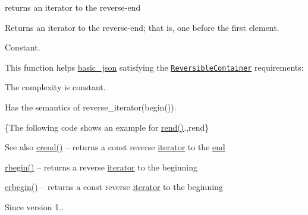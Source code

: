 returns an iterator to the reverse-\/end 

Returns an iterator to the reverse-\/end; that is, one before the first element.

  Constant.

This function helps {\ttfamily \hyperlink{classnlohmann_1_1basic__json}{basic\+\_\+json}} satisfying the \href{http://en.cppreference.com/w/cpp/concept/ReversibleContainer}{\tt Reversible\+Container} requirements\+:
\begin{DoxyItemize}
\item The complexity is constant.
\item Has the semantics of {\ttfamily reverse\+\_\+iterator(begin())}.
\end{DoxyItemize}

\{The following code shows an example for {\ttfamily \hyperlink{classnlohmann_1_1basic__json_aaa160a960dd3dd90856a72b1d8dbe707}{rend()}}.,rend\}

\begin{DoxySeeAlso}{See also}
\hyperlink{classnlohmann_1_1basic__json_aa7084e62b93ef0236698b246a58bb2da}{crend()} -- returns a const reverse \hyperlink{classnlohmann_1_1basic__json_1_1iterator}{iterator} to the \hyperlink{classnlohmann_1_1basic__json_a12ccf14d39ddae52f6c7e126105a230b}{end} 

\hyperlink{classnlohmann_1_1basic__json_a62ccf5b9b3674aec2403fbc02da03db8}{rbegin()} -- returns a reverse \hyperlink{classnlohmann_1_1basic__json_1_1iterator}{iterator} to the beginning 

\hyperlink{classnlohmann_1_1basic__json_a060b33f8f255986088652625f9d50681}{crbegin()} -- returns a const reverse \hyperlink{classnlohmann_1_1basic__json_1_1iterator}{iterator} to the beginning
\end{DoxySeeAlso}
\begin{DoxySince}{Since}
version 1.. 
\end{DoxySince}
\hypertarget{classnlohmann_1_1basic__json_a36fda9749be288cac96cfd846cb62561}{}\label{classnlohmann_1_1basic__json_a36fda9749be288cac96cfd846cb62561} 
